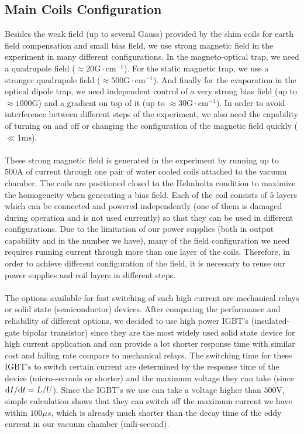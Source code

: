 \subsection{Main Coils Configuration}\label{exp:coil}
Besides the weak field (up to several Gauss) provided by the shim coils for earth field compensation and small bias field, we use strong magnetic field in the experiment in many different configurations. In the magneto-optical trap, we need a quadrupole field ($\approx20\text{G}\cdot\text{cm}^{-1}$). For the static magnetic trap, we use a stronger quadrupole field ($\approx500\text{G}\cdot\text{cm}^{-1}$). And finally for the evaporation in the optical dipole trap, we need independent control of a very strong bias field (up to $\approx1000\text{G}$) and a gradient on top of it (up to $\approx30\text{G}\cdot\text{cm}^{-1}$). In order to avoid interference between different steps of the experiment, we also need the capability of turning on and off or changing the configuration of the magnetic field quickly ($\ll1\text{ms}$).\\
\\
These strong magnetic field is generated in the experiment by running up to $500\text{A}$ of current through one pair of water cooled coils attached to the vacuum chamber. The coils are positioned closed to the Helmholtz condition to maximize the homogeneity when generating a bias field. Each of the coil consists of $5$ layers which can be connected and powered independently (one of them is damaged during operation and is not used currently) so that they can be used in different configurations. Due to the limitation of our power supplies (both in output capability and in the number we have), many of the field configuration we need requires running current through more than one layer of the coils. Therefore, in order to achieve different configuration of the field, it is necessary to reuse our power supplies and coil layers in different steps.\\
\\
The options available for fast switching of such high current are mechanical relays or solid state (semiconductor) devices. After comparing the performance and reliability of different options, we decided to use high power IGBT's (insulated-gate bipolar transistor) since they are the most widely used solid state device for high current application and can provide a lot shorter response time with similar cost and failing rate compare to mechanical relays. The switching time for these IGBT's to switch certain current are determined by the response time of the device (micro-seconds or shorter) and the maximum voltage they can take (since $\mathrm{d} I/\mathrm{d} t=L/U$). Since the IGBT's we use can take a voltage higher than $500\text{V}$, simple calculation shows that they can switch off the maximum current we have within $100\mu s$, which is already much shorter than the decay time of the eddy current in our vacuum chamber (mili-second).\\
